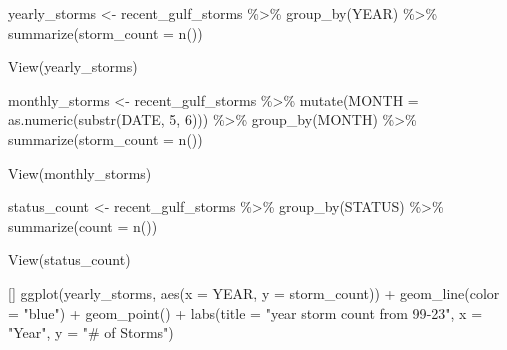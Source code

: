 \documentclass[12pt,letterpaper]{article}
\newenvironment{Shaded}{\begin{snugshade}}{\end{snugshade}}
\newenvironment{Highlighting}{}{}
\newcommand{\DecValTok}[1]{\textcolor[rgb]{0.00,0.00,0.81}{#1}}
\newcommand{\StringTok}[1]{\textcolor[rgb]{0.31,0.60,0.02}{#1}}
\newcommand{\OtherTok}[1]{\textcolor[rgb]{0.56,0.35,0.01}{#1}}
\newcommand{\FunctionTok}[1]{\textcolor[rgb]{0.00,0.00,0.00}{#1}}
\newcommand{\NormalTok}[1]{#1}
\newcommand{\SpecialCharTok}[1]{\textcolor[rgb]{0.00,0.00,0.00}{#1}}
\newcommand{\AttributeTok}[1]{\textcolor[rgb]{0.77,0.63,0.00}{#1}}
\begin{document}
\begin{Shaded}
\begin{Highlighting}[]
\NormalTok{yearly\_storms }\OtherTok{\textless{}{-}}\NormalTok{ recent\_gulf\_storms }\SpecialCharTok{\%\textgreater{}\%}
  \FunctionTok{group\_by}\NormalTok{(YEAR) }\SpecialCharTok{\%\textgreater{}\%}
  \FunctionTok{summarize}\NormalTok{(}\AttributeTok{storm\_count =} \FunctionTok{n}\NormalTok{())}

\FunctionTok{View}\NormalTok{(yearly\_storms)}

\NormalTok{monthly\_storms }\OtherTok{\textless{}{-}}\NormalTok{ recent\_gulf\_storms }\SpecialCharTok{\%\textgreater{}\%}
  \FunctionTok{mutate}\NormalTok{(}\AttributeTok{MONTH =} \FunctionTok{as.numeric}\NormalTok{(}\FunctionTok{substr}\NormalTok{(DATE, }\DecValTok{5}\NormalTok{, }\DecValTok{6}\NormalTok{))) }\SpecialCharTok{\%\textgreater{}\%}
  \FunctionTok{group\_by}\NormalTok{(MONTH) }\SpecialCharTok{\%\textgreater{}\%}
  \FunctionTok{summarize}\NormalTok{(}\AttributeTok{storm\_count =} \FunctionTok{n}\NormalTok{())}

\FunctionTok{View}\NormalTok{(monthly\_storms)}

\NormalTok{status\_count }\OtherTok{\textless{}{-}}\NormalTok{ recent\_gulf\_storms }\SpecialCharTok{\%\textgreater{}\%}
  \FunctionTok{group\_by}\NormalTok{(STATUS) }\SpecialCharTok{\%\textgreater{}\%}
  \FunctionTok{summarize}\NormalTok{(}\AttributeTok{count =} \FunctionTok{n}\NormalTok{())}

\FunctionTok{View}\NormalTok{(status\_count)}
\end{Highlighting}
\end{Shaded}

\begin{Shaded}
\begin{Highlighting}[]
\FunctionTok{ggplot}\NormalTok{(yearly\_storms, }\FunctionTok{aes}\NormalTok{(}\AttributeTok{x =}\NormalTok{ YEAR, }\AttributeTok{y =}\NormalTok{ storm\_count)) }\SpecialCharTok{+}
  \FunctionTok{geom\_line}\NormalTok{(}\AttributeTok{color =} \StringTok{"blue"}\NormalTok{) }\SpecialCharTok{+}
  \FunctionTok{geom\_point}\NormalTok{() }\SpecialCharTok{+}
  \FunctionTok{labs}\NormalTok{(}\AttributeTok{title =} \StringTok{"year storm count from 99{-}23"}\NormalTok{,}
       \AttributeTok{x =} \StringTok{"Year"}\NormalTok{,}
       \AttributeTok{y =} \StringTok{"\# of Storms"}\NormalTok{)}
\end{Highlighting}
\end{Shaded}
\end{document}
